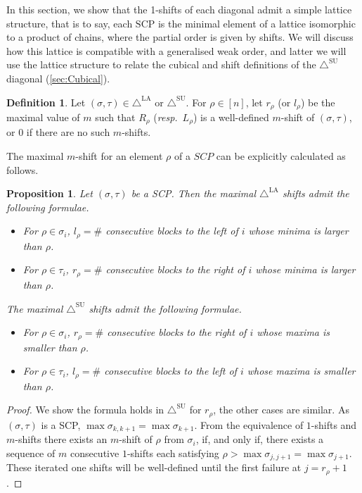 \documentclass{amsart}
\newtheorem{proposition}[theorem]{Proposition}
\theoremstyle{definition}
\newtheorem{definition}[theorem]{Definition}
\newcommand{\resp}{\textit{resp.}~} %
\newcommand{\SUD}{\triangle^{\mathrm{SU}}}
\newcommand{\LAD}{\triangle^{\mathrm{LA}}}
\newcommand{\SCP}{\mathrm{SCP}}
\begin{document}
In this section, we show that the 1-shifts of each diagonal admit a simple lattice structure, that is to say, each $\SCP$ is the minimal element of a lattice isomorphic to a product of chains, where the partial order is given by shifts.
We will discuss how this lattice is compatible with a generalised weak order, and latter we will use the lattice structure to relate the cubical and shift definitions of the $\SUD$ diagonal (\cref{sec:Cubical}).

\begin{definition}
Let $(\sigma,\tau) \in \LAD$ or $\SUD$. For $\rho \in [n]$, let $r_\rho$ (or $l_\rho$) be the maximal value of $m$ such that $R_\rho$ (\resp $L_\rho$) is a well-defined $m$-shift of $(\sigma,\tau)$, or $0$ if there are no such $m$-shifts.

\end{definition}

The maximal $m$-shift for an element $\rho$ of a $SCP$ can be explicitly calculated as follows. 

\begin{proposition}\label{prop:maximal m-shift formulae}
Let $(\sigma,\tau)$ be a SCP. Then the  maximal $\LAD$ shifts admit the following formulae.
\begin{itemize}
	\item For $\rho \in \sigma_i$, $l_\rho = \# $ consecutive blocks to the left of $i$ whose minima is larger than $\rho$.
	\item For $\rho \in \tau_i$, $r_\rho = \# $ consecutive blocks to the right of $i$ whose minima is larger than $\rho$.
\end{itemize}
The maximal $\SUD$ shifts admit the following formulae.
\begin{itemize}
	\item For $\rho \in \sigma_i$, $r_\rho = \# $ consecutive blocks to the right of $i$ whose maxima is smaller than $\rho$.
	\item For $\rho \in \tau_i$, $l_\rho = \# $ consecutive blocks to the left of $i$ whose maxima is smaller than $\rho$.
\end{itemize}
\end{proposition}

\begin{proof}
We show the formula holds in $\SUD$ for $r_\rho$, the other cases are similar. 
As $(\sigma,\tau)$ is a SCP, $\max \sigma_{k,k+1} = \max \sigma_{k+1}$. 
From the equivalence of $1$-shifts and $m$-shifts there exists an $m$-shift of $\rho$ from $\sigma_i$, if, and only if, there exists a sequence of $m$ consecutive $1$-shifts each satisfying $\rho > \max \sigma_{j,j+1}=\max \sigma_{j+1}$.
These iterated one shifts will be well-defined until the first failure at $j=r_\rho+1$.
\end{proof}
\end{document}
